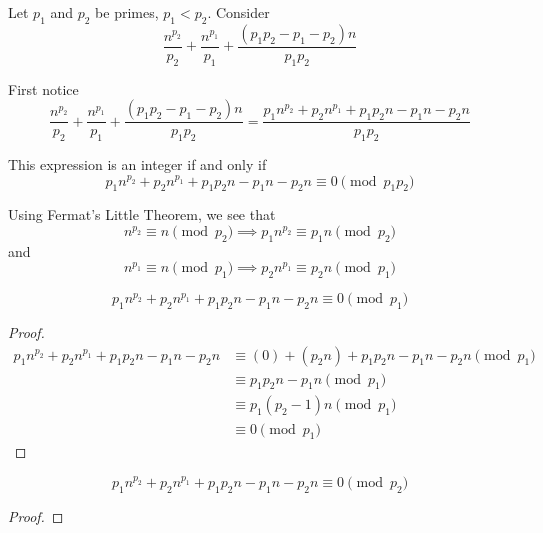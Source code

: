 
Let $p_1$ and $p_2$ be primes, $p_1 < p_2$. Consider
\[ \frac{n^{p_2}}{p_2} + \frac{n^{p_1}}{p_1} + \frac{(p_1 p_2 - p_1 - p_2)n}{p_1 p_2} \]

    First notice
    \[ \frac{n^{p_2}}{p_2} + \frac{n^{p_1}}{p_1} + \frac{(p_1 p_2 - p_1 -
    p_2)n}{p_1 p_2} 
    = 
    \frac
    {p_1 n^{p_2} + p_2 n^{p_1} + p_1 p_2 n - p_1 n - p_2 n}
    {p_1 p_2}
    \]
    
    This expression is an integer if and only if 
    \[p_1 n^{p_2} + p_2 n^{p_1} + p_1 p_2 n - p_1 n - p_2 n \equiv 0 \pmod{p_1 p_2} \]
    
    Using Fermat's Little Theorem, we see that
    \[ n^{p_2} \equiv n \pmod{p_2} \implies  p_1 n^{p_2} \equiv p_1 n  \pmod{p_2} \]
    and 
    \[ n^{p_1} \equiv n \pmod{p_1} \implies  p_2 n^{p_1} \equiv p_2 n \pmod{p_1} \]

\begin{claim}
    \[p_1 n^{p_2} + p_2 n^{p_1} + p_1 p_2 n - p_1 n - p_2 n \equiv 0 \pmod{p_1} \]
\end{claim}
\begin{proof}
    \begin{align*}
    p_1 n^{p_2} + p_2 n^{p_1} + p_1 p_2 n - p_1 n - p_2 n
    &\equiv (0) + (p_2 n) + p_1 p_2 n - p_1 n - p_2 n  \pmod{p_1}\\
    &\equiv p_1 p_2 n - p_1 n \pmod{p_1}\\
    &\equiv p_1 (p_2 -1) n \pmod{p_1}\\
    &\equiv 0 \pmod{p_1}
    \end{align*}
\end{proof}

\begin{claim}
    \[p_1 n^{p_2} + p_2 n^{p_1} + p_1 p_2 n - p_1 n - p_2 n \equiv 0 \pmod{p_2} \]
\end{claim}
\begin{proof}

\end{proof}